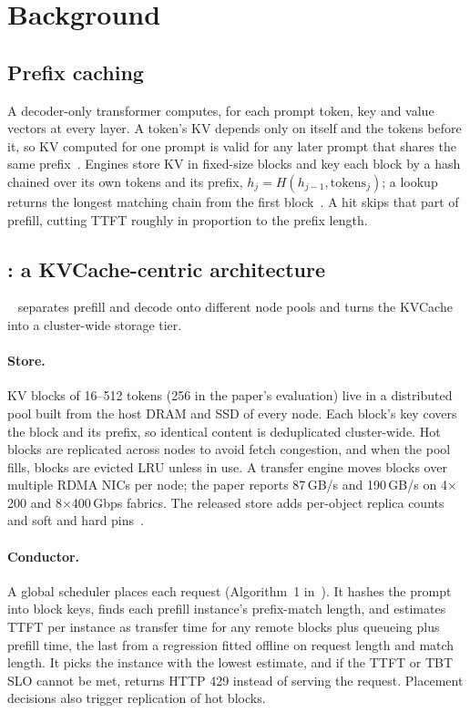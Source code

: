 \section{Background}
\label{sec:background}

\subsection{Prefix caching}
A decoder-only transformer computes, for each prompt token, key and value
vectors at every layer. A token's KV depends only on itself and the tokens
before it, so KV computed for one prompt is valid for any later prompt that
shares the same prefix~\cite{qin2025mooncake}. Engines store KV in fixed-size
blocks and key each block by a hash chained over its own tokens and its
prefix, $h_j = H(h_{j-1}, \mathrm{tokens}_j)$; a lookup returns the longest
matching chain from the first block~\cite{kwon2023vllm,addagada2026kvgov}. A
hit skips that part of prefill, cutting TTFT roughly in proportion to the
prefix length.

\subsection{\mc: a KVCache-centric architecture}
\mc~\cite{qin2025mooncake} separates prefill and decode onto different node
pools and turns the KVCache into a cluster-wide storage tier.

\paragraph{\mc Store.} KV blocks of 16--512 tokens (256 in the paper's
evaluation) live in a distributed pool built from the host DRAM and SSD of
every node. Each block's key covers the block and its prefix, so identical
content is deduplicated cluster-wide. Hot blocks are replicated across nodes to
avoid fetch congestion, and when the pool fills, blocks are evicted LRU unless in
use. A transfer engine moves blocks over multiple RDMA NICs per node; the paper
reports 87\,GB/s and 190\,GB/s on 4$\times$200 and 8$\times$400\,Gbps fabrics.
The released store adds per-object replica counts and soft and hard pins~\cite{mooncakerepo}.

\paragraph{Conductor.} A global scheduler places each request
(Algorithm~1 in~\cite{qin2025mooncake}). It hashes the prompt into block keys,
finds each prefill instance's prefix-match length, and estimates TTFT per
instance as transfer time for any remote blocks plus queueing plus prefill time,
the last from a regression fitted offline on request length and match length.
It picks the instance with the lowest estimate, and if the TTFT or TBT SLO
cannot be met, returns HTTP 429 instead of serving the request. Placement
decisions also trigger replication of hot blocks.

